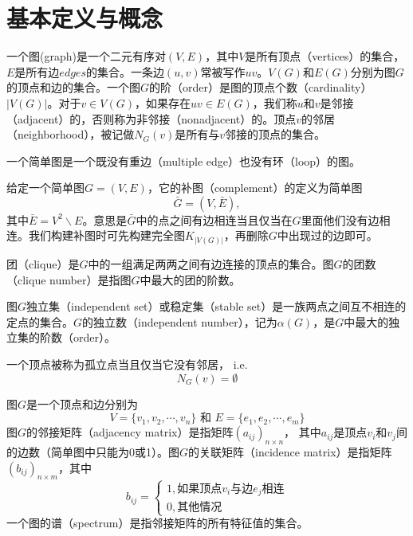 \section{基本定义与概念}
\begin{definition}[图]
	一个图(graph)是一个二元有序对$(V, E)$，其中$V$是所有顶点（vertices）的集合， $E$是所有边$edges$的集合。一条边$(u, v)$常被写作$uv$。$V(G)$和$E(G)$分别为图$G$的顶点和边的集合。一个图$G$的阶（order）是图的顶点个数（cardinality）$|V(G)|$。对于$v\in V(G)$，如果存在$uv\in E(G)$，我们称$u$和$v$是邻接（adjacent）的，否则称为非邻接（nonadjacent）的。顶点$v$的邻居（neighborhood），被记做$N_G(v)$是所有与$v$邻接的顶点的集合。
\end{definition}
\begin{definition}[简单图]
	一个简单图是一个既没有重边（multiple edge）也没有环（loop）的图。
\end{definition}
\begin{definition}[补图]
	给定一个简单图$G = (V, E)$，它的补图（complement）的定义为简单图
	\begin{equation*}
		\bar{G} = (V, \bar{E}),
	\end{equation*}
	其中$\bar{E} = V^2\backslash E$。意思是$\bar{G}$中的点之间有边相连当且仅当在$G$里面他们没有边相连。我们构建补图时可先构建完全图$K_{|V(G)|}$，再删除$G$中出现过的边即可。
\end{definition}
\begin{definition}[团]
	团（clique）是$G$中的一组满足两两之间有边连接的顶点的集合。图$G$的团数（clique number）是指图$G$中最大的团的阶数。
\end{definition}
\begin{definition}[独立集]
	图$G$独立集（independent set）或稳定集（stable set）是一族两点之间互不相连的定点的集合。$G$的独立数（independent number），记为$\alpha(G)$，是$G$中最大的独立集的阶数（order）。
\end{definition}
\begin{definition}[孤立点]
	一个顶点被称为孤立点当且仅当它没有邻居， i.e.
	\begin{equation*}
		N_G(v) = \emptyset
	\end{equation*}
\end{definition}
\begin{definition}[邻接矩阵与关联矩阵]
	图$G$是一个顶点和边分别为
	\begin{equation*}
		V = \{v_1, v_2, \cdots, v_n\} \text{ 和 } E = \{e_1, e_2, \cdots, e_m\}
	\end{equation*}
	图$G$的邻接矩阵（adjacency matrix）是指矩阵$(a_{ij})_{n\times n}$， 其中$a_{ij}$是顶点$v_i$和$v_j$间的边数（简单图中只能为0或1）。图$G$的关联矩阵（incidence matrix）是指矩阵$(b_{ij})_{n\times m}$，其中
	\begin{equation*}
		b_{ij} = \begin{cases}
			1, \text{如果顶点$v_i$与边$e_j$相连}\\
			0, \text{其他情况}
		\end{cases}
	\end{equation*}
	一个图的谱（spectrum）是指邻接矩阵的所有特征值的集合。
\end{definition}
